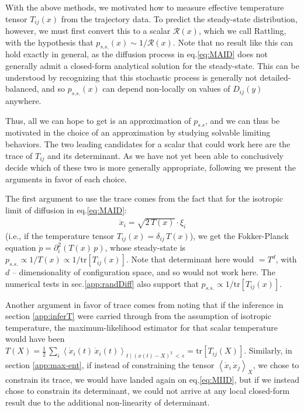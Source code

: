 \documentclass[reprint,prx]{revtex4-1}
\newcommand{\tr}{\mbox{tr}}
\renewcommand{\=}[1]{\stackrel{#1}{=}} %
\renewcommand{\(}{\left (}
\renewcommand{\)}{\right  )}
\renewcommand{\[}{\left [}
\renewcommand{\]}{\right ]}
\newcommand{\<}{\left <}
\renewcommand{\>}{\right >}
\theoremstyle{definition}
\theoremstyle{remark}
\begin{document}
With the above methods, we motivated how to measure effective temperature tensor $ T_{ij}(x) $ from the trajectory data. To predict the steady-state distribution, however, we must first convert this to a scalar $ \mathcal{R}(x) $, which we call Rattling, with the hypothesis that $ p_{s.s.}(x)\sim 1/\mathcal{R}(x) $. Note that no result like this can hold exactly in general, as the diffusion process in eq.\ref{eq:MAID} does not generally admit a closed-form analytical solution for the steady-state. This can be understood by recognizing that this stochastic process is generally not detailed-balanced, and so $ p_{s.s.}(x) $ can depend non-locally on values of $ D_{ij}(y) $ anywhere.

Thus, all we can hope to get is an approximation of $ p_{s.s} $, and we can thus be motivated in the choice of an approximation by studying solvable limiting behaviors. The two leading candidates for a scalar that could work here are the trace of $ T_{ij} $ and its determinant. As we have not yet been able to conclusively decide which of these two is more generally appropriate, following we present the arguments in favor of each choice.

The first argument to use the trace comes from the fact that for the isotropic limit of diffusion in eq.\ref{eq:MAID}: 
\begin{align} \label{eq:MIID}
\dot{x}_i = \sqrt{2\,T(x)}\cdot \xi_i
\end{align}
 (i.e., if the temperature tensor $ T_{ij}(x) = \delta_{ij}\,T(x) $), we get the Fokker-Planck equation $ \dot{p} = \partial_i^2(T(x)\, p) $, whose steady-state is $ p_{s.s.}\propto 1/T(x) \propto 1/\tr[T_{ij}(x)]$. Note that determinant here would $ = T^d $, with $ d $ -- dimensionality of configuration space, and so would not work here. The numerical tests in sec.\ref{app:randDiff} also support that $ p_{s.s.}\propto 1/\tr[T_{ij}(x)]$.

Another argument in favor of trace comes from noting that if the inference in section \ref{app:inferT} were carried through from the assumption of isotropic temperature, the maximum-likelihood estimator for that scalar temperature would have been $ T(X) = \frac{1}{2}\, \sum_i \<\dot{x}_i(t)\,  \dot{x}_i(t)\>_{t\; |\;(x(t)-X)^2 \,<\, \epsilon} = \tr\[T_{ij}(X)\] $. Similarly, in section \ref{app:max-ent}, if instead of constraining the tensor $ \< \dot{x}_i\, \dot{x}_j\> _X $, we chose to constrain its trace, we would have landed again on eq.\ref{eq:MIID}, but if we instead chose to constrain its determinant, we could not arrive at any local closed-form result due to the additional non-linearity of determinant.
\end{document}
